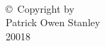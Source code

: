 

\thispagestyle{empty}
\hbox{\ }

\vfill
\renewcommand{\baselinestretch}{1}
\small\normalsize

\vspace{-.65in}

\begin{center}
\large{\copyright \hbox{ }Copyright by\\
Patrick Owen Stanley  %
\\
20018}
\end{center}

\vfill
